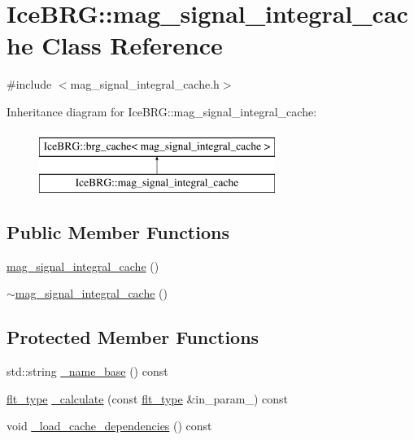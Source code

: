 \hypertarget{classIceBRG_1_1mag__signal__integral__cache}{}\section{Ice\+B\+R\+G\+:\+:mag\+\_\+signal\+\_\+integral\+\_\+cache Class Reference}
\label{classIceBRG_1_1mag__signal__integral__cache}


{\ttfamily \#include $<$mag\+\_\+signal\+\_\+integral\+\_\+cache.\+h$>$}

Inheritance diagram for Ice\+B\+R\+G\+:\+:mag\+\_\+signal\+\_\+integral\+\_\+cache\+:\begin{figure}[H]
\begin{center}
\leavevmode
\includegraphics[height=2.000000cm]{classIceBRG_1_1mag__signal__integral__cache}
\end{center}
\end{figure}
\subsection*{Public Member Functions}
\begin{DoxyCompactItemize}
\item 
\hyperlink{classIceBRG_1_1mag__signal__integral__cache_afa83d06fc1f822daa7090672932a2628}{mag\+\_\+signal\+\_\+integral\+\_\+cache} ()
\item 
\hyperlink{classIceBRG_1_1mag__signal__integral__cache_a7b9e8bef6cf4be45d2433d1d67456935}{$\sim$mag\+\_\+signal\+\_\+integral\+\_\+cache} ()
\end{DoxyCompactItemize}
\subsection*{Protected Member Functions}
\begin{DoxyCompactItemize}
\item 
std\+::string \hyperlink{classIceBRG_1_1mag__signal__integral__cache_a0fba2d585686eeb7df8ad63a12467286}{\+\_\+name\+\_\+base} () const 
\item 
\hyperlink{lib_2IceBRG__main_2common_8h_ad0f130a56eeb944d9ef2692ee881ecc4}{flt\+\_\+type} \hyperlink{classIceBRG_1_1mag__signal__integral__cache_a580ab95b1c68dab69c368bf5bda1f741}{\+\_\+calculate} (const \hyperlink{lib_2IceBRG__main_2common_8h_ad0f130a56eeb944d9ef2692ee881ecc4}{flt\+\_\+type} \&in\+\_\+param\+\_) const 
\item 
void \hyperlink{classIceBRG_1_1mag__signal__integral__cache_a9f027f5fd56a5997d374586c0a035b4c}{\+\_\+load\+\_\+cache\+\_\+dependencies} () const 
\end{DoxyCompactItemize}

